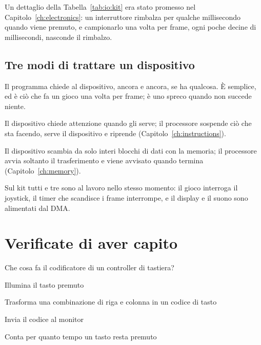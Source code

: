 Un dettaglio della Tabella~\ref{tab:io:kit} era stato promesso nel
Capitolo~\ref{ch:electronics}: un interruttore rimbalza per qualche
millisecondo quando viene premuto, e campionarlo una volta per frame, ogni
poche decine di millisecondi, nasconde il rimbalzo.

\subsection{Tre modi di trattare un dispositivo}

\begin{description}[style=nextline,leftmargin=1.5em]
\item[Polling (I/O programmato).] Il programma chiede al dispositivo, ancora e
  ancora, se ha qualcosa. È semplice, ed è ciò che fa un gioco una volta per
  frame; è uno spreco quando non succede niente.
\item[Interruzioni.] Il dispositivo chiede attenzione quando gli serve; il
  processore sospende ciò che sta facendo, serve il dispositivo e riprende
  (Capitolo~\ref{ch:instructions}).
\item[Accesso diretto alla memoria.] Il dispositivo scambia da solo interi
  blocchi di dati con la memoria; il processore avvia soltanto il
  trasferimento e viene avvisato quando termina (Capitolo~\ref{ch:memory}).
\end{description}

\begin{prgmachine}
Sul kit tutti e tre sono al lavoro nello stesso momento: il gioco interroga il
joystick, il timer che scandisce i frame interrompe, e il display e il suono
sono alimentati dal DMA.
\end{prgmachine}





\section{Verificate di aver capito}

\begin{quiz}{Che cosa fa il codificatore di un controller di tastiera?}
\item Illumina il tasto premuto
\item Trasforma una combinazione di riga e colonna in un codice di tasto
\item Invia il codice al monitor
\item Conta per quanto tempo un tasto resta premuto
\end{quiz}

